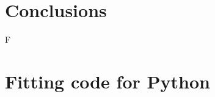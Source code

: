\documentclass[a4paper, 10pt, nanum]{CSUniSchoolLabReport}
\begin{document}

\section{Conclusions}

	F


\section{Fitting code for Python}



\end{document}
